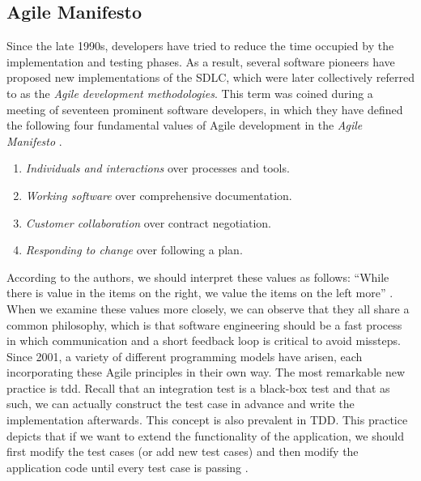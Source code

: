 
\subsection{Agile Manifesto}
Since the late 1990s, developers have tried to reduce the time occupied by the implementation and testing phases. As a result, several software pioneers have proposed new implementations of the SDLC, which were later collectively referred to as the \emph{Agile development methodologies}. This term was coined during a meeting of seventeen prominent software developers, in which they have defined the following four fundamental values of Agile development in the \emph{Agile Manifesto} \cite{beck2001agile}.

\begin{enumerate}
	\item \emph{Individuals and interactions} over processes and tools.
	\item \emph{Working software} over comprehensive documentation.
	\item \emph{Customer collaboration} over contract negotiation.
	\item \emph{Responding to change} over following a plan.
\end{enumerate}

\noindent According to the authors, we should interpret these values as follows: ``While there is value in the items on the right, we value the items on the left more'' \cite{beck2001agile}. When we examine these values more closely, we can observe that they all share a common philosophy, which is that software engineering should be a fast process in which communication and a short feedback loop is critical to avoid missteps. Since 2001, a variety of different programming models have arisen, each incorporating these Agile principles in their own way. The most remarkable new practice is \acrfull{tdd}. Recall that an integration test is a black-box test and that as such, we can actually construct the test case in advance and write the implementation afterwards. This concept is also prevalent in TDD. This practice depicts that if we want to extend the functionality of the application, we should first modify the test cases (or add new test cases) and then modify the application code until every test case is passing \cite{10.5555/579193}.